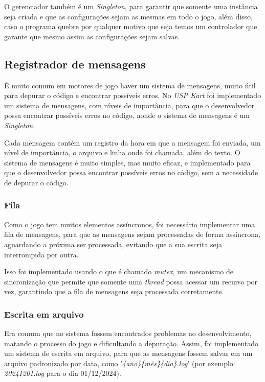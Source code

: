 O gerenciador também é um \textit{Singleton}, para garantir que somente uma instância seja criada e que as configurações sejam as mesmas em todo o jogo, além disso, caso o programa quebre por qualquer motivo que seja temos um controlador que garante que mesmo assim as configurações sejam salvas.

\subsection{Registrador de mensagens}
É muito comum em motores de jogo haver um sistema de mensagens, muito útil para depurar o código e encontrar possíveis erros. No \textit{USP Kart} foi implementado um sistema de mensagens, com níveis de importância, para que o desenvolvedor possa encontrar possíveis erros no código, aonde o sistema de mensagens é um \textit{Singleton}.

Cada mensagem contém um registro da hora em que a mensagem foi enviada, um nível de importância, o arquivo e linha onde foi chamada, além do texto. O sistema de mensagens é muito simples, mas muito eficaz, e implementado para que o desenvolvedor possa encontrar possíveis erros no código, sem a necessidade de depurar o código.

\subsubsection{Fila}

Como o jogo tem muitos elementos assíncronos, foi necessário implementar uma fila de mensagens, para que as mensagens sejam processadas de forma assíncrona, aguardando a próxima ser processada, evitando que a sua escrita seja interrompida por outra.

Isso foi implementado usando o que é chamado \textit{mutex}, um mecanismo de sincronização que permite que somente uma \textit{thread} possa acessar um recurso por vez, garantindo que a fila de mensagens seja processada corretamente.

\subsubsection{Escrita em arquivo}

Era comum que no sistema fossem encontrados problemas no desenvolvimento, matando o processo do jogo e dificultando a depuração. Assim, foi implementado um sistema de escrita em arquivo, para que as mensagens fossem salvas em um arquivo padronizado por data, como '\textit{\{ano\}\{mês\}\{dia\}.log}' (por exemplo: \textit{20241201.log} para o dia 01/12/2024).

